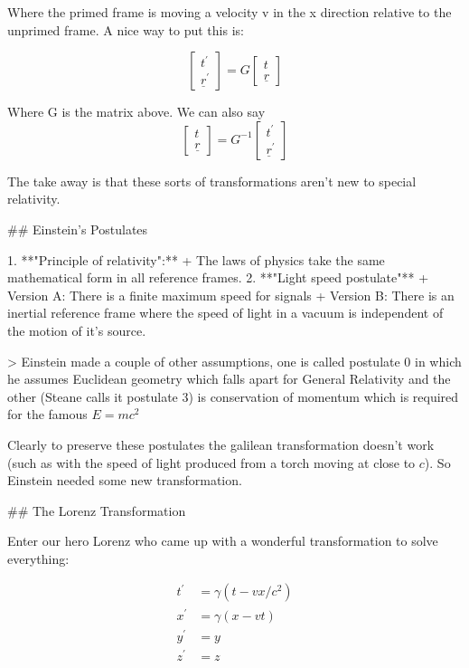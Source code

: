 Where the primed frame is moving a velocity v in the x direction relative to the unprimed frame. A nice way to put this is:

$$
\begin{bmatrix}
    t^\prime\\
    \underline{r}^\prime
\end{bmatrix}
= G
\begin{bmatrix}
    t\\
    \underline{r}
\end{bmatrix}
$$

Where G is the matrix above. We can also say 
$$

\begin{bmatrix}
    t\\
    \underline{r}
\end{bmatrix}
= G^{-1}
\begin{bmatrix}
    t^\prime\\
    \underline{r}^\prime
\end{bmatrix}
$$

The take away is that these sorts of transformations aren't new to special relativity.

## Einstein's Postulates

1. **"Principle of relativity":**
   + The laws of physics take the same mathematical form in all reference frames.
2. **"Light speed postulate"**
   + Version A: There is a finite maximum speed for signals
   + Version B: There is an inertial reference frame where the speed of light in a vacuum is independent of the motion of it's source.

> Einstein made a couple of other assumptions, one is called postulate 0 in which he assumes Euclidean geometry which falls apart for General Relativity and the other (Steane calls it postulate 3) is conservation of momentum which is required for the famous $E=mc^2$

Clearly to preserve these postulates the galilean transformation doesn't work (such as with the speed of light produced from a torch moving at close to $c$). So Einstein needed some new transformation.

## The Lorenz Transformation

Enter our hero Lorenz who came up with a wonderful transformation to solve everything:

$$
\begin{aligned}
t^\prime &= \gamma(t-vx/c^2)\\
x^\prime &= \gamma(x -vt)\\
y^\prime &= y\\
z^\prime &= z
\end{aligned}
$$

